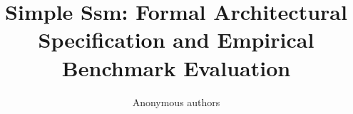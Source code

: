 \title{\textbf{Simple Ssm: Formal Architectural Specification and Empirical Benchmark Evaluation}}

\author{Anonymous authors}
